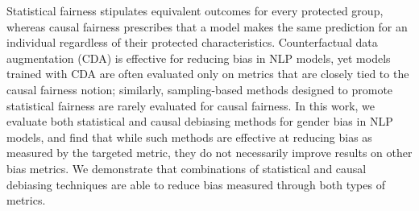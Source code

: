 Statistical fairness stipulates equivalent outcomes for every protected group, whereas causal fairness prescribes that a model makes the same prediction for an individual regardless of their protected characteristics. Counterfactual data augmentation (CDA) is effective for reducing bias in NLP models, yet models trained with CDA are often evaluated only on metrics that are closely tied to the causal fairness notion; similarly, sampling-based methods designed to promote statistical fairness are rarely evaluated for causal fairness. In this work, we evaluate both statistical and causal debiasing methods for gender bias in NLP models, and find that while such methods are effective at reducing bias as measured by the targeted metric, they do not necessarily improve results on other bias metrics. We demonstrate that combinations of statistical and causal debiasing techniques are able to reduce bias measured through both types of metrics.